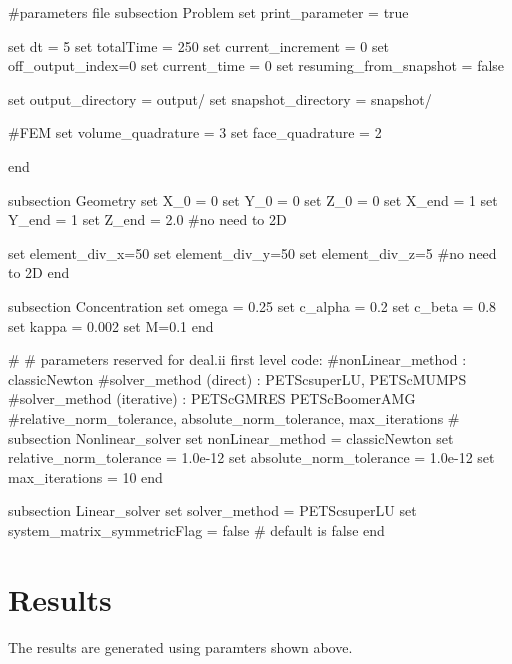 \begin{DoxyCode}
\textcolor{preprocessor}{#parameters file}
\textcolor{preprocessor}{}
subsection Problem
set print\_parameter = \textcolor{keyword}{true}

set dt = 5
set totalTime = 250
set current\_increment = 0
set off\_output\_index=0
set current\_time = 0
set resuming\_from\_snapshot = \textcolor{keyword}{false}

set output\_directory = output/
set snapshot\_directory = snapshot/

\textcolor{preprocessor}{#FEM}
\textcolor{preprocessor}{}set volume\_quadrature = 3 
set face\_quadrature = 2 

end

subsection Geometry
set X\_0 = 0
set Y\_0 = 0
set Z\_0 = 0
set X\_end = 1 
set Y\_end = 1
set Z\_end = 2.0 #no need to 2D

set element\_div\_x=50
set element\_div\_y=50
set element\_div\_z=5 #no need to 2D
end

subsection Concentration
set omega = 0.25
set c\_alpha = 0.2
set c\_beta = 0.8
set kappa = 0.002
set M=0.1
end
                        
\textcolor{preprocessor}{#}
\textcolor{preprocessor}{}\textcolor{preprocessor}{# parameters reserved for deal.ii first level code:}
\textcolor{preprocessor}{}\textcolor{preprocessor}{#nonLinear\_method : classicNewton}
\textcolor{preprocessor}{}\textcolor{preprocessor}{#solver\_method (direct) : PETScsuperLU, PETScMUMPS}
\textcolor{preprocessor}{}\textcolor{preprocessor}{#solver\_method (iterative) : PETScGMRES PETScBoomerAMG}
\textcolor{preprocessor}{}\textcolor{preprocessor}{#relative\_norm\_tolerance, absolute\_norm\_tolerance, max\_iterations}
\textcolor{preprocessor}{}\textcolor{preprocessor}{#}
\textcolor{preprocessor}{}subsection Nonlinear\_solver
        set nonLinear\_method = classicNewton
        set relative\_norm\_tolerance = 1.0e-12
        set absolute\_norm\_tolerance = 1.0e-12
        set max\_iterations = 10
end
                        
subsection Linear\_solver
        set solver\_method = PETScsuperLU
        set system\_matrix\_symmetricFlag = \textcolor{keyword}{false} # \textcolor{keywordflow}{default} is \textcolor{keyword}{false}
end
\end{DoxyCode}
\hypertarget{growth_results}{}\section{Results}\label{growth_results}
The results are generated using paramters shown above.

  